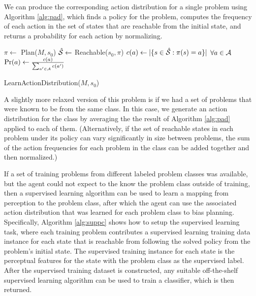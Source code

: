 \documentclass{article}
\begin{document}
We can produce the corresponding action distribution for a single problem using Algorithm \ref{alg:pad}, which finds a policy for the problem, computes the frequency of each action in the set of
states that are reachable from the initial state, and returns a probability
for each action by normalizing.
\begin{algorithm}
\begin{algorithmic}
\State $\pi \gets$ Plan($M, s_0$)
\State $\hat{\cal S} \gets$ Reachable($s_0, \pi$) 
\State $c(a) \gets |\{ s \in \hat{\cal S} : \pi(s) = a \}|$  $\forall a \in {\cal A}$ 
\State $\Pr(a) \gets \frac{c(a)}{\sum_{a' \in {\cal A}} c(a')}$
\State {}
\end{algorithmic}
\caption{LearnActionDistribution($M, s_0$)}
\label{alg:pad}
\end{algorithm}

A slightly more relaxed version of this problem is if we had a set of problems that were known to be from the same class. In this case, we generate an action distribution for the class by averaging the the result of Algorithm \ref{alg:pad} applied to each of them. (Alternatively, if the set of reachable states in each problem under its policy can vary significantly in size between problems, the sum of the action frequencies for each problem in the class can be added together and then normalized.)

If a set of training problems from different labeled problem classes was available, but the agent could not expect to the know the problem class outside of training, then a supervised learning algorithm can be used to learn a mapping from perception to the problem class, after which the agent can use the associated action distribution that was learned for each problem class to bias planning. Specifically, Algorithm \ref{alg:suppc} shows how to setup the supervised learning task, where each training problem contributes a supervised
learning training data instance for each state that is reachable from following
the solved policy from the problem's initial state. The supervised training
instance for each state is the perceptual features for the state with the problem class as the supervised label. After the supervised training dataset is constructed, any suitable off-the-shelf supervised learning algorithm can be used to train a classifier, which is then returned.
\end{document}
